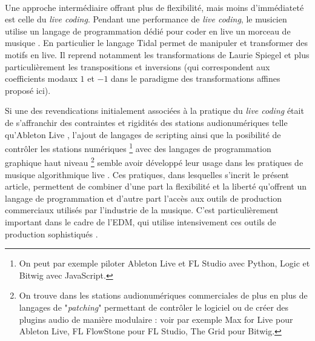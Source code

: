 \paragraph*{}

Une approche intermédiaire offrant plus de flexibilité, mais moins d'immédiateté est celle du \emph{live coding}. Pendant une performance de \emph{live coding}, le musicien utilise un langage de programmation dédié pour coder en live un morceau de musique \cite{blackwell2022live}. En particulier le langage Tidal \cite{mclean2010tidal} permet de manipuler et transformer des motifs en live. Il reprend notamment les transformations de Laurie Spiegel \cite{spiegel1981manipulations} et plus particulièrement les transpositions et inversions (qui correspondent aux coefficients modaux $1$ et $-1$ dans le paradigme des transformations affines proposé ici).

Si une des revendications initialement associées à la pratique du \emph{live coding} était de s'affranchir des contraintes et rigidités des stations audionumériques telle qu'Ableton Live \cite{collins2003live}, l'ajout de langages de scripting  ainsi que la posibilité de contrôler les stations numériques \footnote{On peut par exemple piloter  Ableton Live et FL Studio avec Python, Logic et Bitwig avec JavaScript.} avec des langages de programmation graphique haut niveau \footnote{On trouve dans les stations audionumériques commerciales de plus en plus de langages de "\emph{patching}" permettant de contrôler le logiciel ou de créer des plugins audio de manière modulaire : voir par exemple Max for Live pour Ableton Live, FL FlowStone pour FL Studio, The Grid pour Bitwig.} semble avoir développé leur usage dans les pratiques de musique algorithmique live \cite{collins2014algorave}. Ces pratiques, dans lesquelles s'incrit le présent article, permettent de combiner d'une part la flexibilité et la liberté qu'offrent un langage de programmation et d'autre part l'accès aux outils de production commerciaux utilisés par l'industrie de la musique. C'est particulièrement important dans le cadre de l'EDM, qui utilise intensivement ces outils de production sophistiqués \cite{fraser2012spaces}.

